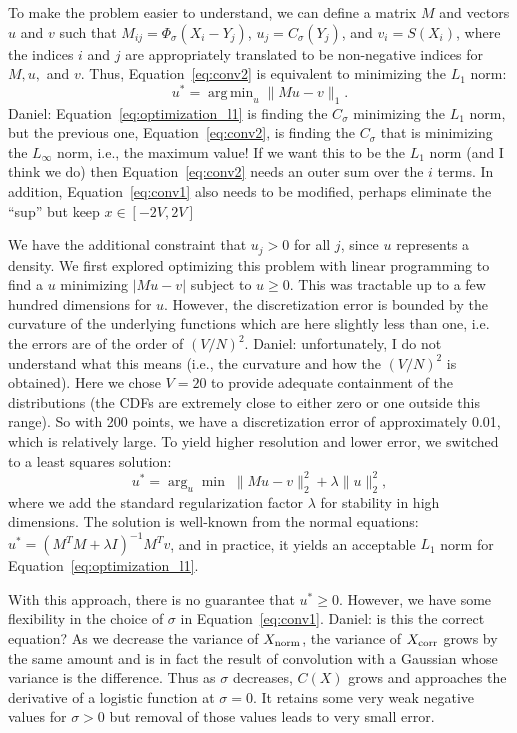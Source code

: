 \documentclass{article}
\DeclareMathOperator*{\argmin}{arg\,min}
\begin{document}
To make the problem easier to understand, we can define a matrix $M$ and vectors
$u$ and $v$ such that $M_{ij} = \Phi_{\sigma}(X_i-Y_j)$, $u_j =
C_{\sigma}(Y_j)$, and $v_i = S(X_i)$, where the indices $i$ and $j$ are
appropriately translated to be non-negative indices for $M, u,$ and $v$. Thus,
Equation~\ref{eq:conv2} is equivalent to minimizing the $L_1$ norm:
\begin{equation}\label{eq:optimization_l1}
    u^* = \argmin_{u} \|Mu-v\|_1.
\end{equation}
{\color{blue} Daniel: Equation~\ref{eq:optimization_l1} is finding
the $C_\sigma$ minimizing the $L_1$ norm, but the previous one,
Equation~\ref{eq:conv2}, is finding the $C_\sigma$ that is minimizing the
$L_\infty$ norm, i.e., the maximum value! If we want this to be the $L_1$ norm
(and I think we do) then Equation~\ref{eq:conv2} needs an outer sum over the $i$
terms. In addition, Equation~\ref{eq:conv1} also needs to be modified, perhaps
eliminate the ``sup'' but keep $x \in [-2V,2V]$}

We have the additional constraint that $u_j > 0$ for all $j$, since $u$
represents a density. We first explored optimizing this problem with linear
programming to find a $u$ minimizing $|Mu - v|$ subject to $u \ge 0$. This was
tractable up to a few hundred dimensions for $u$. However, the discretization
error is bounded by the curvature of the underlying functions which are here
slightly less than one, i.e.  the errors are of the order of $(V/N)^2$.
{\color{blue} Daniel: unfortunately, I do not understand what this means (i.e.,
the curvature and how the $(V/N)^2$ is obtained).} Here we chose $V=20$ to
provide adequate containment of the distributions (the CDFs are extremely close
to either zero or one outside this range). So with 200 points, we have a
discretization error of approximately 0.01, which is relatively large.  To yield
higher resolution and lower error, we switched to a least squares solution:
\begin{equation}\label{eq:optimization_l2}
    u^* = \arg_u \min \; \|Mu-v\|_2^2 + \lambda \|u\|_2^2,
\end{equation}
where we add the standard regularization factor $\lambda$ for stability in high
dimensions. The solution is well-known from the normal equations: $u^* = (M^TM +
\lambda I)^{-1}M^Tv$, and in practice, it yields an acceptable $L_1$ norm for
Equation~\ref{eq:optimization_l1}.

With this approach, there is no guarantee that $u^* \geq 0$. However, we have
some flexibility in the choice of $\sigma$ in Equation~\ref{eq:conv1}.
{\color{blue} Daniel: is this the correct equation?} As we decrease the variance
of $X_{\rm norm}$, the variance of $X_{\rm corr}$ grows by the same amount and
is in fact the result of convolution with a Gaussian whose variance is the
difference.  Thus as $\sigma$ decreases, $C(X)$ grows and approaches the
derivative of a logistic function at $\sigma = 0$. It retains some very weak
negative values for $\sigma > 0$ but removal of those values leads to very small
error.
\end{document}
